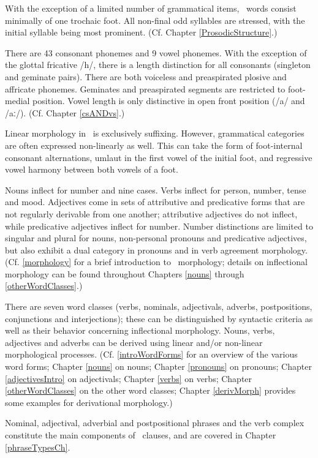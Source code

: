 With the exception of a limited number of grammatical items, \PS\ words consist minimally of one trochaic foot. All non-final odd syllables are stressed, with the initial syllable being most prominent. (Cf. Chapter \ref{ProsodicStructure}.) 

There are 43 consonant phonemes and 9 vowel phonemes. With the exception of the glottal fricative /h/, there is a length distinction for all consonants (singleton and geminate pairs). There are both voiceless and preaspirated plosive and affricate phonemes. Geminates and preaspirated segments are restricted to foot-medial position. Vowel length is only distinctive in open front position (/a/ and /aː/). (Cf. Chapter \ref{csANDvs}.) 

Linear morphology in \PS\ is exclusively suffixing. However, grammatical categories are often expressed non-linearly as well. This can take the form of foot-internal consonant alternations, umlaut in the first vowel of the initial foot, and regressive vowel harmony between both vowels of a foot. 

Nouns inflect for number and nine cases. Verbs inflect for person, number, tense and mood. Adjectives come in sets of attributive and predicative forms that are not regularly derivable from one another; attributive adjectives do not inflect, while predicative adjectives inflect for number. Number distinctions are limited to singular and plural for nouns, non-personal pronouns and predicative adjectives, but also exhibit a dual category in pronouns and in verb agreement morphology. (Cf. \SEC\ref{morphology} for a brief introduction to \PS\ morphology; details on inflectional morphology can be found throughout Chapters \ref{nouns} through \ref{otherWordClasses}.) 

There are seven word classes (verbs, nominals, adjectivals, adverbs, postpositions, conjunctions and interjections); these can be distinguished by syntactic criteria as well as their behavior concerning inflectional morphology. Nouns, verbs, adjectives and adverbs can be derived using linear and/or non-linear morphological processes. (Cf. \SEC\ref{introWordForms} for an  overview of the various word forms; Chapter \ref{nouns} on nouns; Chapter \ref{pronouns} on pronouns; Chapter \ref{adjectivesIntro} on adjectivals; Chapter \ref{verbs} on verbs; Chapter \ref{otherWordClasses} on the other word classes; Chapter \ref{derivMorph} provides some examples for derivational morphology.) 

Nominal, adjectival, adverbial and postpositional phrases and the verb complex constitute the main components of \PS\ clauses, and are covered in Chapter \ref{phraseTypesCh}. 

